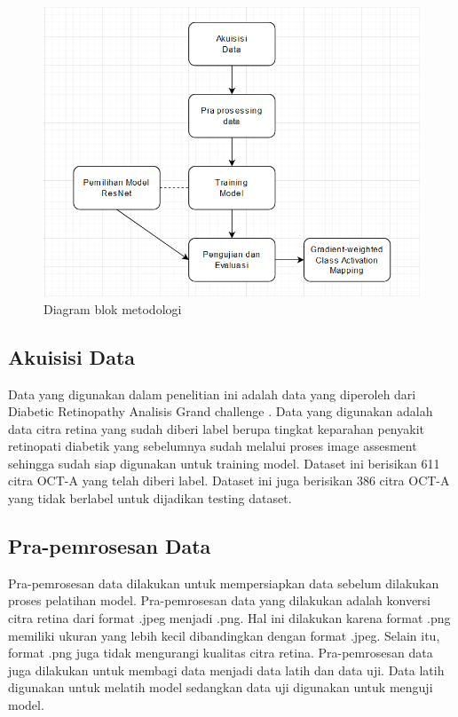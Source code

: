 \begin{figure} [H] \centering
	\includegraphics[scale=0.5]{gambar/diagramMethod.png}
	\caption{Diagram blok metodologi}
	\label{fig:diagramMethod}
\end{figure}

\subsection{Akuisisi Data}
\label{sec:321}
Data yang digunakan dalam penelitian ini adalah data yang diperoleh dari Diabetic Retinopathy Analisis Grand challenge \parencite{drac_challenge_2023_10280359}. Data yang digunakan adalah data citra retina yang sudah diberi label berupa tingkat keparahan penyakit retinopati diabetik yang sebelumnya sudah melalui proses image assesment sehingga sudah siap digunakan untuk training model. Dataset ini berisikan 611 citra OCT-A yang telah diberi label. Dataset ini juga berisikan 386 citra OCT-A yang tidak berlabel untuk dijadikan testing dataset.

\subsection{Pra-pemrosesan Data}
\label{sec:322}
Pra-pemrosesan data dilakukan untuk mempersiapkan data sebelum dilakukan proses pelatihan model. Pra-pemrosesan data yang dilakukan adalah konversi citra retina dari format .jpeg menjadi .png. Hal ini dilakukan karena format .png memiliki ukuran yang lebih kecil dibandingkan dengan format .jpeg. Selain itu, format .png juga tidak mengurangi kualitas citra retina. Pra-pemrosesan data juga dilakukan untuk membagi data menjadi data latih dan data uji. Data latih digunakan untuk melatih model sedangkan data uji digunakan untuk menguji model.

